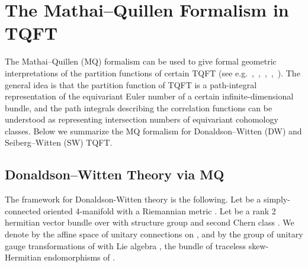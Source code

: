 \documentclass[a4paper,12pt,reqno,sumlimits]{amsart}
\theoremstyle{plain}
\theoremstyle{definition}
\providecommand{\1}{{\bf 1}}
\providecommand{\g}{{\mathfrak  g}}
\providecommand{\calA}{{\mathcal A}}
\providecommand{\calG}{{\mathcal G}}
\numberwithin{equation}{section}
\begin{document}

\section{The Mathai--Quillen Formalism in TQFT} 
\label{mq_tqft}

The Mathai--Quillen (MQ) formalism can be used to give formal geometric
interpretations of the partition functions of certain TQFT (see
e.g.~\cite{radu},~\cite{labastida_marino3},~\cite{labastida_marino4},~\cite{marino},~\cite{wu}).
The general idea is that the partition function of TQFT is a path-integral
representation of the equivariant Euler number of a certain
infinite-dimensional bundle, and the path integrals describing the
correlation functions can be understood as representing intersection numbers
of equivariant cohomology classes.  Below we summarize the MQ formalism for
Donaldson--Witten (DW) and Seiberg--Witten (SW) TQFT.


\subsection{Donaldson--Witten Theory via MQ}
\label{dwmq}

The framework for Donaldson-Witten theory is the following. Let \coordHE{} be a
simply-connected oriented 4-manifold with a Riemannian metric \coordHE{}.  Let \coordHE{}
be a rank 2 hermitian vector bundle over \coordHE{} with structure group \coordHE{} and
second Chern class \coordHE{}. We denote by \myHighlight{$\calA_E$}\coordHE{} the affine space of
unitary connections on \coordHE{}, and by \myHighlight{$\calG_E$}\coordHE{} the group of unitary gauge
transformations of \coordHE{} with Lie algebra \myHighlight{$\g_E=su(E)$}\coordHE{}, the bundle of traceless
skew-Hermitian endomorphisms of \coordHE{}.
\end{document}
